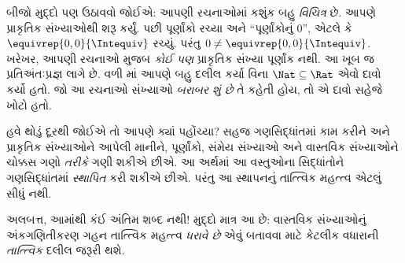 \documentclass[../../../include/open-logic-section]{subfiles}
\begin{document}
બીજો મુદ્દો પણ ઉઠાવવો જોઈએ: આપણી રચનાઓમાં કશુંક બહુ \emph{વિચિત્ર}
છે. આપણે પ્રાકૃતિક સંખ્યાઓથી શરૂ કર્યું. પછી પૂર્ણાંકો રચ્યા અને
``પૂર્ણાંકોનું $0$'', એટલે કે $\equivrep{0,0}{\Intequiv}$ રચ્યું.
પરંતુ $0 \neq \equivrep{0,0}{\Intequiv}$. ખરેખર, આપણી રચનાઓ મુજબ
\emph{કોઈ પણ} પ્રાકૃતિક સંખ્યા પૂર્ણાંક નથી. આ ખૂબ જ પ્રતિઅંતઃપ્રજ્ઞ
લાગે છે. વળી માં આપણે બહુ દલીલ કર્યા વિના
$\Nat \subseteq \Rat$ એવો દાવો કર્યો હતો. જો આ રચનાઓ સંખ્યાઓ
\emph{બરાબર શું છે} તે કહેતી હોય, તો એ દાવો સહેજે ખોટો હતો.

હવે થોડું દૂરથી જોઈએ તો આપણે ક્યાં પહોંચ્યા? સહજ ગણસિદ્ધાંતમાં કામ
કરીને અને પ્રાકૃતિક સંખ્યાઓને આપેલી માનીને, પૂર્ણાંકો, સંમેય સંખ્યાઓ
અને વાસ્તવિક સંખ્યાઓને ચોક્કસ ગણો \emph{તરીકે} ગણી શકીએ છીએ. આ અર્થમાં
આ વસ્તુઓના સિદ્ધાંતોને ગણસિદ્ધાંતમાં \emph{સ્થાપિત} કરી શકીએ છીએ.
પરંતુ આ સ્થાપનનું તાત્ત્વિક મહત્ત્વ એટલું સીધું નથી.

અલબત્ત, આમાંથી કંઈ અંતિમ શબ્દ નથી!{} મુદ્દો માત્ર આ છે: વાસ્તવિક
સંખ્યાઓનું અંકગણિતીકરણ ગહન તાત્ત્વિક મહત્ત્વ \emph{ધરાવે છે} એવું
બતાવવા માટે કેટલીક વધારાની \emph{તાત્ત્વિક} દલીલ જરૂરી થશે.

\end{document}
